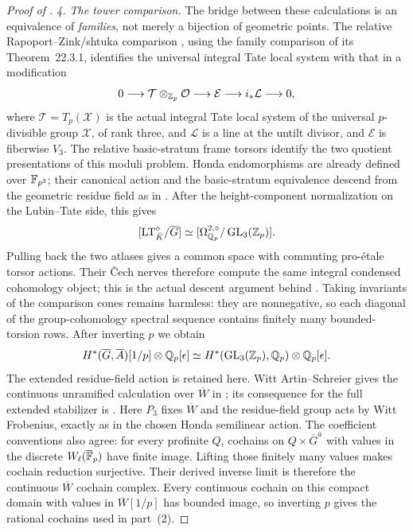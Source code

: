 \begin{proof}[Proof of ]
\medskip\noindent\emph{4. The tower comparison.} The bridge between these calculations is an equivalence of
\emph{families}, not merely a bijection of geometric points.
The relative Rapoport--Zink/shtuka comparison
\cite[Theorem~24.2.5 and its proof, pp.~227--229]{ScholzeWeinsteinBerkeley},
using the family comparison of its Theorem~22.3.1, identifies the
universal integral
Tate local system with that in a modification
\[
 0\longrightarrow \mathcal T\otimes_{\mathbb Z_p}\mathcal O
   \longrightarrow\mathcal E\longrightarrow i_*\mathcal L
   \longrightarrow0,
\]
where $\mathcal T=T_p(\mathcal X)$ is the actual integral Tate local
system of the universal $p$-divisible group $\mathcal X$, of rank
three, and $\mathcal L$ is a line at the
untilt divisor, and $\mathcal E$ is fiberwise $V_3$.
The relative basic-stratum frame torsors
\cite[Theorems~III.2.4 and III.4.5]{FarguesScholze} identify the two quotient
presentations of this moduli problem.  Honda endomorphisms are
already defined over $\mathbb F_{p^3}$; their canonical action and the
basic-stratum equivalence descend from the geometric residue
field as in .  After the height-component
normalization on the Lubin--Tate side, this gives
\[
 [\mathrm{LT}_{\breve K}^{\diamond}/\overline G]
 \simeq[\Omega^{2,\diamond}_{\mathbb Q_p}/\operatorname{GL}_3(\mathbb Z_p)].
\]
Pulling back the two atlases gives a common space with commuting
pro-\'etale torsor actions.  Their \v Cech nerves therefore compute
the same integral condensed cohomology object; this is the
actual descent argument behind \cite[Theorem~3.9.1 and (3.9.3)]{BSSW}.
Taking invariants of the comparison cones remains harmless:
they are nonnegative, so each diagonal of the group-cohomology
spectral sequence contains finitely many bounded-torsion rows.
After inverting $p$ we obtain
\[
 H^*(\overline G,\overline A)[1/p]\otimes\mathbb Q_p[\epsilon]
 \simeq H^*(\operatorname{GL}_3(\mathbb Z_p),\mathbb Q_p)\otimes\mathbb Q_p[\epsilon].
\]
The extended residue-field action is retained here.
Witt Artin--Schreier gives the continuous unramified calculation
over $\overline W$ in \cite[Lemma~3.8.5(1)]{BSSW};
its consequence for the full extended stabilizer is
\cite[Lemma~3.8.5(2)]{BSSW}.  Here $P_3$ fixes $\overline W$ and the
residue-field group acts by Witt Frobenius, exactly as in the chosen
Honda semilinear action.  The coefficient conventions also agree:
for every profinite $Q$, cochains on $Q\times\overline G^a$ with
values in the discrete $W_\ell(\overline{\mathbb F}_p)$ have finite image.
Lifting those finitely many values makes cochain reduction surjective.  Their derived inverse limit is therefore
the continuous $\overline W$ cochain complex.  Every continuous
cochain on this compact domain with values in $\overline W[1/p]$
has bounded image, so inverting $p$ gives the rational cochains
used in part~(2).


\end{proof}

